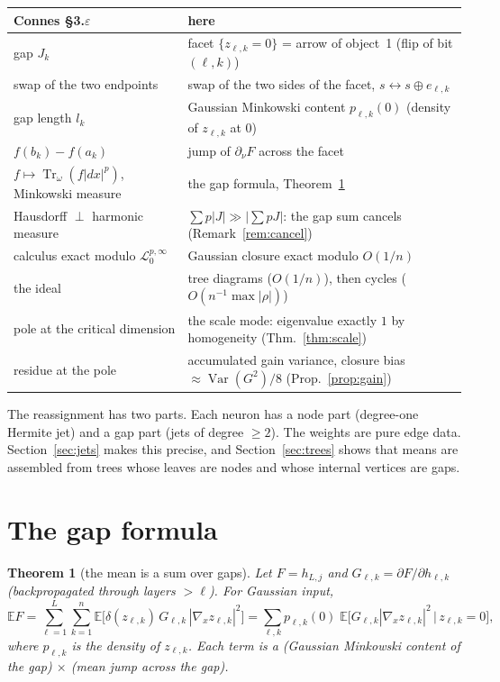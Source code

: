 \documentclass[11pt]{article}
\newtheorem{theorem}{Theorem}[section]
\theoremstyle{definition}
\theoremstyle{remark}
\newcommand{\E}{\mathbb E}
\newcommand{\Tr}{\operatorname{Tr}}
\begin{document}
\begin{center}
\small
\begin{tabular}{@{}p{}p{}@{}}
\toprule
Connes \S3.$\varepsilon$ & here\\
\midrule
gap $J_k$ & facet $\{z_{\ell,k}=0\}$ = arrow of object~1 (flip of bit $(\ell,k)$)\\
swap of the two endpoints & swap of the two sides of the facet, $s\leftrightarrow s\oplus e_{\ell,k}$\\
gap length $l_k$ & Gaussian Minkowski content $p_{\ell,k}(0)$ (density of $z_{\ell,k}$ at $0$)\\
$f(b_k)-f(a_k)$ & jump of $\partial_\nu F$ across the facet\\
$f\mapsto\Tr_\omega(f|dx|^p)$, Minkowski measure & the gap formula, Theorem~\ref{thm:gap}\\
Hausdorff $\perp$ harmonic measure & $\sum p|J|\gg|\sum pJ|$: the gap sum cancels (Remark~\ref{rem:cancel})\\
calculus exact modulo $\mathcal L^{p,\infty}_0$ & Gaussian closure exact modulo $O(1/n)$\\
the ideal & tree diagrams ($O(1/n)$), then cycles ($O(n^{-1}\max|\rho|)$)\\
pole at the critical dimension & the scale mode: eigenvalue exactly $1$ by homogeneity (Thm.~\ref{thm:scale})\\
residue at the pole & accumulated gain variance, closure bias $\approx\operatorname{Var}(G^2)/8$ (Prop.~\ref{prop:gain})\\
\bottomrule
\end{tabular}
\end{center}

\noindent The reassignment has two parts. Each neuron has a node part (degree-one Hermite jet) and a gap part (jets of degree $\ge2$). The weights are pure edge data. Section~\ref{sec:jets} makes this precise, and Section~\ref{sec:trees} shows that means are assembled from trees whose leaves are nodes and whose internal vertices are gaps.

\section{The gap formula}\label{sec:gap}

\begin{theorem}[the mean is a sum over gaps]\label{thm:gap}
Let $F=h_{L,j}$ and $G_{\ell,k}=\partial F/\partial h_{\ell,k}$ (backpropagated through layers $>\ell$). For Gaussian input,
\[
\E F=\sum_{\ell=1}^{L}\sum_{k=1}^{n}\E\big[\delta(z_{\ell,k})\,G_{\ell,k}\,|\nabla_xz_{\ell,k}|^2\big]
=\sum_{\ell,k}p_{\ell,k}(0)\;\E\big[G_{\ell,k}|\nabla_xz_{\ell,k}|^2\,\big|\,z_{\ell,k}=0\big],
\]
where $p_{\ell,k}$ is the density of $z_{\ell,k}$. Each term is a (Gaussian Minkowski content of the gap) $\times$ (mean jump across the gap).
\end{theorem}
\end{document}
